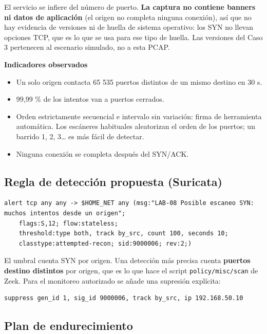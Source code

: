 El servicio se infiere del número de puerto. \textbf{La captura no contiene banners ni datos de aplicación} (el origen no completa ninguna conexión), así que no hay evidencia de versiones ni de huella de sistema operativo: los SYN no llevan opciones TCP, que es lo que se usa para ese tipo de huella. Las versiones del Caso 3 pertenecen al escenario simulado, no a esta PCAP.

\textbf{Indicadores observados}

\begin{itemize}
  \item Un solo origen contacta 65 535 puertos distintos de un mismo destino en 30 s.
  \item 99,99 \% de los intentos van a puertos cerrados.
  \item Orden estrictamente secuencial e intervalo sin variación: firma de herramienta automática. Los escáneres habituales aleatorizan el orden de los puertos; un barrido 1, 2, 3\ldots{} es más fácil de detectar.
  \item Ninguna conexión se completa después del SYN/ACK.
\end{itemize}

\subsection{Regla de detección propuesta (Suricata)}

\begin{lstlisting}
alert tcp any any -> $HOME_NET any (msg:"LAB-08 Posible escaneo SYN: muchos intentos desde un origen";
    flags:S,12; flow:stateless;
    threshold:type both, track by_src, count 100, seconds 10;
    classtype:attempted-recon; sid:9000006; rev:2;)
\end{lstlisting}

El umbral cuenta SYN por origen. Una detección más precisa cuenta \textbf{puertos destino distintos} por origen, que es lo que hace el script \texttt{policy/misc/scan} de Zeek. Para el monitoreo autorizado se añade una supresión explícita:

\begin{lstlisting}
suppress gen_id 1, sig_id 9000006, track by_src, ip 192.168.50.10
\end{lstlisting}

\subsection{Plan de endurecimiento}

